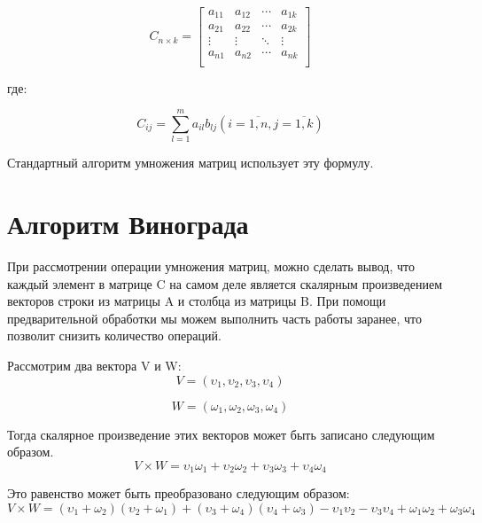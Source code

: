 \begin{equation}
  C_{n\times k} =
  \left[ {\begin{array}{cccc}
    a_{11} & a_{12} & \cdots & a_{1k}\\
    a_{21} & a_{22} & \cdots & a_{2k}\\
    \vdots & \vdots & \ddots & \vdots\\
    a_{n1} & a_{n2} & \cdots & a_{nk}\\
  \end{array} } \right]
\label{mat_c}
\end{equation}

где:

\begin{equation}
C_{ij} = \sum_{l=1} ^{m} a_{il} b_{lj} (i = \overline{1,n}, j = \overline{1,k})
\label{c_elem}
\end{equation}

Стандартный алгоритм умножения матриц использует эту формулу.

\section{Алгоритм Винограда}

При рассмотрении операции умножения матриц, можно сделать вывод, что каждый элемент в матрице C на самом деле является скалярным произведением векторов строки из матрицы A и столбца из матрицы B. При помощи предварительной обработки мы можем выполнить часть работы заранее, что позволит снизить количество операций.

Рассмотрим два вектора V и W:
\begin{equation}
V = (\upsilon_{1}, \upsilon_{2}, \upsilon_{3}, \upsilon_{4})
\label{v_vec}
\end{equation}

\begin{equation}
W = (\omega_{1}, \omega_{2}, \omega_{3}, \omega_{4})
\label{w_vec}
\end{equation}

Тогда скалярное произведение этих векторов может быть записано следующим образом.
\begin{equation}
V \times W = \upsilon_{1}\omega_{1} + \upsilon_{2}\omega_{2} + \upsilon_{3}\omega_{3} + \upsilon_{4}\omega_{4}
\label{vw_vec}
\end{equation}

Это равенство может быть преобразовано следующим образом:
\begin{equation}
V \times W = (\upsilon_{1} + \omega_{2})(\upsilon_{2} + \omega_{1}) + (\upsilon_{3} + \omega_{4})(\upsilon_{4} + \omega_{3}) - \upsilon_{1}\upsilon_{2} - \upsilon_{3}\upsilon_{4} + \omega_{1}\omega_{2} + \omega_{3}\omega_{4}
\label{vw_vec_rest}
\end{equation}

